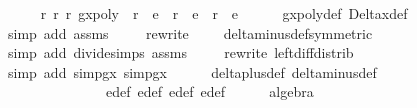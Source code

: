 %
	
\begin{isabellebody}%

\ \ \isamarkupfalse%
\ {\isachardoublequoteopen}{\isasymexists}\ r{}\ r{}\ r{}{\isachardot}\ gxpoly\ {\isacharequal}\ r{}\ {\isacharasterisk}\ e{}\ {\isacharplus}\ r{}\ {\isacharasterisk}\ e{}\ {\isacharplus}\ r{}\ {\isacharasterisk}\ e{}{\isachardoublequoteclose}\isanewline
\ \ \ \ \isamarkupfalse%
\ gxpoly{\isacharunderscore}def\ Delta\isactrlsub x{\isacharunderscore}def\ \isanewline
\ \ \ \ \isamarkupfalse%
{\isacharparenleft}simp\ add{\isacharcolon}\ assms{\isacharparenleft}{}{\isacharcomma}{}{\isacharparenright}{\isacharparenright}\isanewline
\ \ \ \ \isamarkupfalse%
{\isacharparenleft}rewrite\ \ {\isachardoublequoteopen}{\isacharunderscore}\ {\isacharslash}\ {\isasymhole}{\isachardoublequoteclose}\ delta{\isacharunderscore}minus{\isacharunderscore}def{\isacharbrackleft}symmetric{\isacharbrackright}{\isacharparenright}{\isacharplus}\isanewline
\ \ \ \ \isamarkupfalse%
{\isacharparenleft}simp\ add{\isacharcolon}\ divide{\isacharunderscore}simps\ assms{\isacharparenleft}{}{\isacharcomma}{}{}{\isacharparenright}{\isacharparenright}\isanewline
\ \ \ \ \isamarkupfalse%
{\isacharparenleft}rewrite\ left{\isacharunderscore}diff{\isacharunderscore}distrib{\isacharparenright}\isanewline
\ \ \ \ \isamarkupfalse%
{\isacharparenleft}simp\ add{\isacharcolon}\ simp{}gx\ simp{}gx{\isacharparenright}\isanewline
\ \ \ \ \isamarkupfalse%
\ delta{\isacharunderscore}plus{\isacharunderscore}def\ delta{\isacharunderscore}minus{\isacharunderscore}def\isanewline
\ \ \ \ \ \ \ \ \ \ \ \ \ \ e{}{\isacharunderscore}def\ e{}{\isacharunderscore}def\ e{}{\isacharunderscore}def\ e{\isacharunderscore}def\isanewline
\ \ \ \ \isamarkupfalse%
\ algebra\isanewline

\end{isabellebody}%



